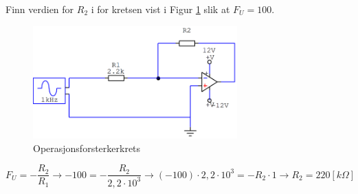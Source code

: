 \begin{question}[name=Oppgave, topic=operasjonsforsterker]
Finn verdien for $R_2$ i for kretsen vist i Figur \ref{fig:invCircuit1} slik at $F_U=100$.
\begin{figure}[H]
	\centering
	\includegraphics[width=0.7\textwidth]{operasjonsforsterker/figurer/invBasicCir.png}
	\caption{Operasjonsforsterkerkrets}
	\label{fig:invCircuit1}
\end{figure}

\end{question}

\vspace{0.5cm} %

\begin{solution}[name=Løsningsforslag oppgave]

\[F_U = -\frac{R_2}{R_1} \rightarrow -100 = -\frac{R_2}{2,2 \cdot 10^{3}} \rightarrow (-100) \cdot 2,2 \cdot 10^3 = -R_2 \cdot 1 \rightarrow R_2 = 220 [k\Omega]\]

\end{solution}
\vspace{0.5cm} %




